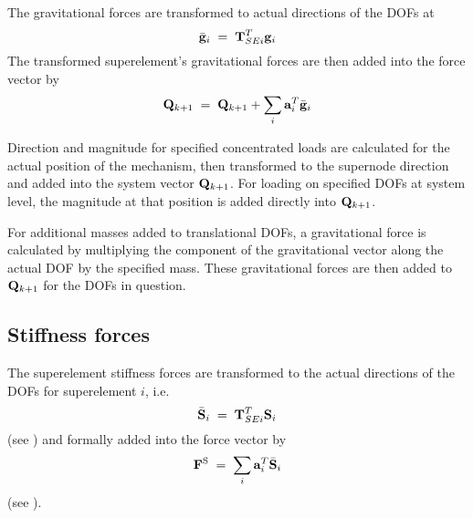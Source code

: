 The gravitational forces are transformed to actual directions of the DOFs at
\iftoggle{publicedition}{%
system level by means of the superelement transformation matrix ${\mf T}_{SEi}$
}{%
system level by means of the transformation matrix~\eqref{eqSC:59}
} %
%
\begin{equation}
\bar{\bf g}_i \;=\; {\bf T}_{SEi}^T {\bf g}_i
\label{eq:343}
\end{equation}
%
\iftoggle{publicedition}{}{%
(see also \eqsref{eqSC:510}{eqSC:511}).
} %
The transformed superelement's gravitational forces are then added
into the force vector by
%
\begin{equation}
\Q_\kp1 \;=\; \Q_\kp1 + \sum\limits_i {\mf a}_i^T \bar{\mf g}_i
\label{eq:344}
\end{equation}
%
\iftoggle{publicedition}{}{%
(refer to \eqsref{eqSC:512}{eqSC:513}).
} %

Direction and magnitude for specified concentrated loads are calculated for the
actual position of the mechanism, then transformed to the supernode direction
\iftoggle{publicedition}{}{%
by the transformation matrix from \eqnref{eqSC:57} or~\eqref{eqSC:58},
} %
and added into the system vector $\Q_\kp1$.
For loading on specified DOFs at system level, the magnitude at that position is
added directly into $\Q_\kp1$.

For additional masses added to translational DOFs, a gravitational force is
calculated by multiplying the component of the gravitational vector along the
actual DOF by the specified mass.
These gravitational forces are then added to $\Q_\kp1$ for the DOFs in question.

\subsection{Stiffness forces}

The superelement stiffness forces are
\iftoggle{publicedition}{}{%
calculated as shown in Section~\ref{sec:SupElIntForce}. These forces are then}
transformed to the actual directions of the DOFs for superelement $i$, i.e.
%
\begin{equation}
\bar{\bf S}_i \;=\; {\bf T}_{SEi}^T {\bf S}_i
\label{eq:350}
\end{equation}
%
(see ) and formally added into the force vector by
%
\begin{equation}
{\bf F}^{\rm S} \;=\; \sum\limits_i {\bf a}_i^T \bar{\bf S}_i
\label{eq:351}
\end{equation}
%
(see ).

